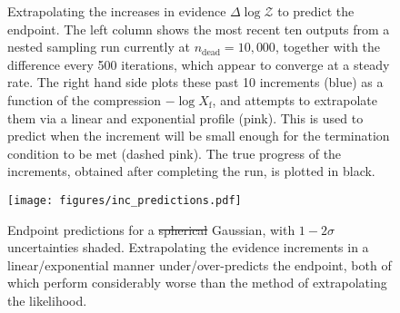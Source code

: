 \documentclass[usenatbib]{mnras}
\providecommand{\DIFaddtex}[1]{{\protect\color{blue}\uwave{#1}}} %
\providecommand{\DIFdeltex}[1]{{\protect\color{red}\sout{#1}}}                      %
\providecommand{\DIFaddFL}[1]{\DIFadd{#1}} %
\providecommand{\DIFdelFL}[1]{\DIFdel{#1}} %
\providecommand{\DIFaddbeginFL}{} %
\providecommand{\DIFaddendFL}{} %
\providecommand{\DIFdelbeginFL}{} %
\providecommand{\DIFdelendFL}{} %
\providecommand{\DIFadd}[1]{\texorpdfstring{\DIFaddtex{#1}}{#1}} %
\providecommand{\DIFdel}[1]{\texorpdfstring{\DIFdeltex{#1}}{}} %
\newcommand{\DIFscaledelfig}{0.5}
\newlength{\DIFdelgraphicswidth} %
\newlength{\DIFdelgraphicsheight} %
\newcommand{\DIFaddincludegraphics}[2][]{{\color{blue}\fbox{\DIFOincludegraphics[#1]{#2}}}} %
\newcommand{\DIFdelincludegraphics}[2][]{%
\sbox{\DIFdelgraphicsbox}{\DIFOincludegraphics[#1]{#2}}%
\settoboxwidth{\DIFdelgraphicswidth}{\DIFdelgraphicsbox} %
\settoboxtotalheight{\DIFdelgraphicsheight}{\DIFdelgraphicsbox} %
\scalebox{\DIFscaledelfig}{%
\parbox[b]{\DIFdelgraphicswidth}{\usebox{\DIFdelgraphicsbox}\\[-\baselineskip] \rule{\DIFdelgraphicswidth}{0em}}\llap{\resizebox{\DIFdelgraphicswidth}{\DIFdelgraphicsheight}{%
\setlength{\unitlength}{\DIFdelgraphicswidth}%
\begin{picture}(1,1)%
\thicklines\linethickness{2pt} %
{\color[rgb]{1,0,0}\put(0,0){\framebox(1,1){}}}%
{\color[rgb]{1,0,0}\put(0,0){\line( 1,1){1}}}%
{\color[rgb]{1,0,0}\put(0,1){\line(1,-1){1}}}%
\end{picture}%
}\hspace*{3pt}}} %
} %
\DeclareRobustCommand{\DIFaddbeginFL}{\DIFOaddbeginFL \let\includegraphics\DIFaddincludegraphics} %
\DeclareRobustCommand{\DIFaddendFL}{\DIFOaddendFL \let\includegraphics\DIFOincludegraphics} %
\DeclareRobustCommand{\DIFdelbeginFL}{\DIFOdelbeginFL \let\includegraphics\DIFdelincludegraphics} %
\DeclareRobustCommand{\DIFdelendFL}{\DIFOaddendFL \let\includegraphics\DIFOincludegraphics} %
\begin{document}
\begin{figure}
\begin{adjustbox}{valign=t, scale=0.7}
\end{adjustbox}
\quad
\begin{adjustbox}{valign=t, scale=0.9}
\end{adjustbox}
\caption{Extrapolating the increases in evidence $\Delta \log \mathcal{Z}$ to predict the endpoint. The left column shows the most recent ten outputs from a nested sampling run currently at $n_\mathrm{dead} = 10,000$, together with the difference every 500 iterations, which appear to converge at a steady rate. The right hand side plots these past 10 increments (blue) as a function of the compression $-\log X_\mathrm{f}$, and attempts to extrapolate them via a linear and exponential profile (pink). This is used to predict when the increment will be small enough for the termination condition to be met (dashed pink). The true progress of the increments, obtained after completing the run, is plotted in black.}
\label{fig:inc_extrapolate}
\end{figure}
\begin{figure}
\texttt{[image: figures/inc\_predictions.pdf]}
\caption{Endpoint predictions for a \DIFdelbeginFL \DIFdelFL{spherical }\DIFdelendFL \DIFaddbeginFL \DIFaddFL{isotropic }\DIFaddendFL Gaussian, with $1-2\sigma$ uncertainties shaded. Extrapolating the evidence increments in a linear/exponential manner under/over-predicts the endpoint, both of which perform considerably worse than the method of extrapolating the likelihood.}
\label{fig:inc_predictions}
\end{figure}
\end{document}
